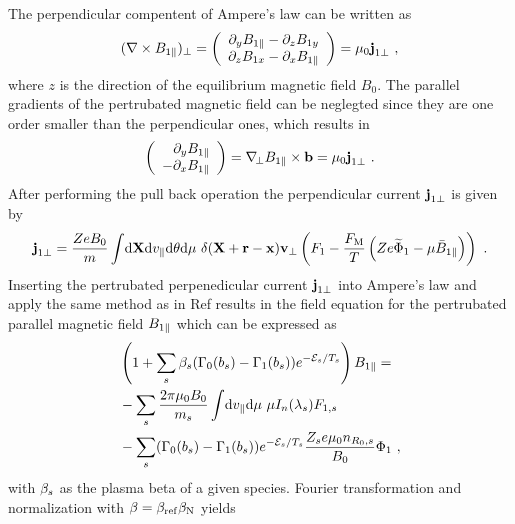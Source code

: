 The perpendicular compentent of Ampere's law can be written as 
\begin{gather}
	(\nabla \times B_{1\parallel})_\perp = \left( \begin{array}{c} \partial_y B_{1\parallel} - \partial_z B_{1 y} \\ \partial_z B_{1x} - \partial_x B_{1\parallel} \end{array} \right) = \mu_0 \boldsymbol{\mathbf{j}}_{1 \perp}~,
	\label{eq:perpendicularAmpereLawLocal}
\end{gather}
where $z$ is the direction of the equilibrium magnetic field $B_0$. The parallel gradients of the pertrubated magnetic field can be neglegted since they are one order smaller than the perpendicular ones, which results in
\begin{gather}
	\left( \begin{array}{r} \partial_y B_{1\parallel} \\ - \partial_x B_{1\parallel} \end{array} \right) = \nabla_{\!\perp} B_{1\parallel} \times \boldsymbol{\mathbf{b}} = \mu_0 \boldsymbol{\mathbf{j}}_{1 \perp}~.
\end{gather}
After performing the pull back operation the perpendicular current $\boldsymbol{\mathbf{j}}_{1\perp}$ is given by 
\begin{gather}
		\boldsymbol{\mathbf{j}}_{1\perp} = \frac{Ze B_0}{m} \int \! \mathrm{d}\boldsymbol{\mathbf{X}}\mathrm{d}v_\parallel\mathrm{d}\theta\mathrm{d}\mu ~ \delta(\boldsymbol{\mathbf{X}} + \boldsymbol{\mathbf{r}} - \boldsymbol{\mathbf{x}}) \boldsymbol{\mathbf{v}}_\perp \left(F_1 - \frac{F_\mathrm{M}}{T}\left(Ze \widetilde{\Phi}_1 - \mu \bar{B}_{1\parallel}\right) \right) ~.
	\label{eq:perpendicularCurrentPullbackLocal}
\end{gather}
Inserting the pertrubated perpenedicular current $\boldsymbol{\mathbf{j}}_{1 \perp}$ into Ampere's law and apply the same method as in Ref  results in the field equation for the pertrubated parallel magnetic field $B_{1\parallel}$ which can be expressed as
\begin{gather}
    \begin{aligned}
        &\left(1 + \sum_s \beta_s (\Gamma_0(b_s) - \Gamma_1(b_s)) e^{-\mathcal{E}_s/T_s}\right) B_{1\parallel} = \\
	 &- \sum_s \frac{2\pi \mu_0 B_0}{m_s} \int \! \mathrm{d}v_\parallel\mathrm{d}\mu ~ \mu I_n(\lambda_s) F_{1,s}  \\
        &- \sum_s (\Gamma_0(b_s) - \Gamma_1(b_s))e^{-\mathcal{E}_s/T_s} \frac{Z_se \mu_0 n_{R_0,s}}{B_0} \Phi_1 ~,
    \end{aligned}
    \label{eq:fieldMagneticLocal}
\end{gather}
with $\beta_s$ as the plasma beta of a given species. Fourier transformation and normalization with $\beta = \beta_\mathrm{ref} \beta_\mathrm{N}$ yields
